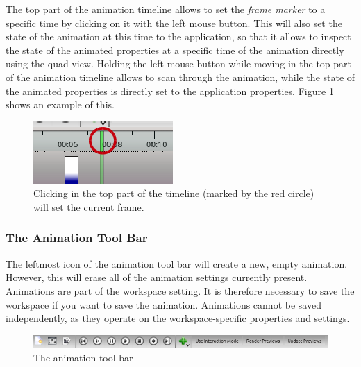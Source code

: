 The top part of the animation timeline allows to set the \emph{frame marker} to a specific time by clicking on it with the left mouse button. This will also set
the state of the animation at this time to the application, so that it allows to inspect the state of the animated properties at a specific time of the animation
directly using the quad view. Holding the left mouse button while moving in the top part of the animation timeline allows to scan through the animation, while
the state of the animated properties is directly set to the application properties. Figure \ref{fig:animation_marker} shows an example of this.

\begin{figure}[htb]
 \centering
 \includegraphics[scale=0.8,keepaspectratio=true]{./images/animation_marker1.png}
 \caption{Clicking in the top part of the timeline (marked by the red circle) will set the current frame.}
 \label{fig:animation_marker}
\end{figure}

\subsubsection{The Animation Tool Bar}

The leftmost icon of the animation tool bar will create a new, empty animation. However, this will erase all of the animation settings currently 
present. Animations are part of the workspace setting. It is therefore necessary to save the workspace if you want to save the animation. Animations
cannot be saved independently, as they operate on the workspace-specific properties and settings.

\begin{figure}[!htb]
 \centering
 \includegraphics[scale=0.7,keepaspectratio=true]{./images/animation_toolbar.png}
 \caption{The animation tool bar}
 \label{fig:animation_toolbar}
\end{figure}

